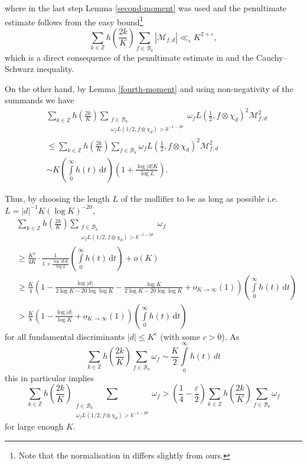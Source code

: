 \documentclass[a4paper,10pt,twoside]{amsart}
\theoremstyle{definition}
\numberwithin{equation}{section}
\newcommand\Z{\mathbb{Z}}
\newcommand\eps{\varepsilon}
\renewcommand\:{\colon}
\begin{document}
where in the last step Lemma \ref{second-moment} was used and the penultimate estimate follows from the easy bound\footnote{Note that the normalisation in \cite{Iwaniec-Sarnak2000} differs slightly from ours.}
\[ 
\sum_{k\in\Z}h\left(\frac{2k}K\right)\sum_{f\in\mathcal B_k}|\mathcal M_{f,d}|\ll_\eps K^{2+\eps},\]
which is a direct consequence of the penultimate estimate in \cite[p. 164]{Iwaniec-Sarnak2000} and the Cauchy--Schwarz inequality.
   
On the other hand, by Lemma \ref{fourth-moment} and using non-negativity of the summands we have
\begin{align*}
&\sum_{k\in\Z}h\left(\frac{2k}K\right)\sum_{\substack{f\in\mathcal B_k\\
\omega_f L(1/2,f\otimes\chi_d)> k^{-1-2\theta}}}\omega_f L\left(\frac12,f\otimes\chi_{d}\right)^2\mathcal M_{f,d}^2\\
&\leq \sum_{k\in\Z}h\left(\frac{2k}K\right)\sum_{f\in\mathcal B_k}\omega_f L\left(\frac12,f\otimes\chi_{d}\right)^2\mathcal M_{f,d}^2\\
&\sim K\left(\int\limits_0^\infty h(t)\,\mathrm d t\right)\left(1+\frac{\log |d|K}{\log L} \right).
\end{align*}

Thus, by choosing the length $L$ of the mollifier to be as long as possible i.e. $L=|d|^{-1}K(\log K)^{-20}$, 
\begin{align*}
&\sum_{k\in\Z}h\left(\frac{2k}K\right)\sum_{\substack{f\in \mathcal B_k\\
\omega_f L(1/2,f\otimes\chi_d)> k^{-1-2\theta}}}\omega_f\\
&\geq\frac{K^2}{4K}\cdot\frac1{1+\frac{\log |d|K}{\log L}}\left(\int\limits_0^\infty h(t)\,\mathrm d t\right)+o(K) \nonumber\\
&\geq\frac K4\left(1-\frac{\log |d|}{2\log K-20\log\log K}-\frac{\log K}{2\log K-20\log\log K}+o_{K\rightarrow\infty}(1)\right)\left(\int\limits_0^\infty h(t)\,\mathrm d t\right) \nonumber \\
&>\frac K8\left(1-\frac{\log |d|}{\log K}+o_{K\rightarrow\infty}(1)\right)\left(\int\limits_0^\infty h(t)\,\mathrm d t\right)
\end{align*}
for all fundamental discriminants $|d|\leq K^c$ (with some $c>0$). As
\[ 
\sum_{k\in\Z}h\left(\frac{2k}K\right)\sum_{f\in\mathcal B_k}\omega_f\sim\frac K2\int\limits_0^\infty h(t)\,dt\]
this in particular implies
\[ 
\sum_{k\in\Z}h\left(\frac{2k}K\right)\sum_{\substack{f\in \mathcal B_k\\
\omega_f L(1/2,f\otimes\chi_d)> k^{-1-2\theta}}}\omega_f>\left(\frac14-\frac\eps2\right)\sum_{k\in\Z}h\left(\frac{2k}K\right)\sum_{f\in\mathcal B_k}\omega_f\]
for large enough $K$. 
\end{document}
